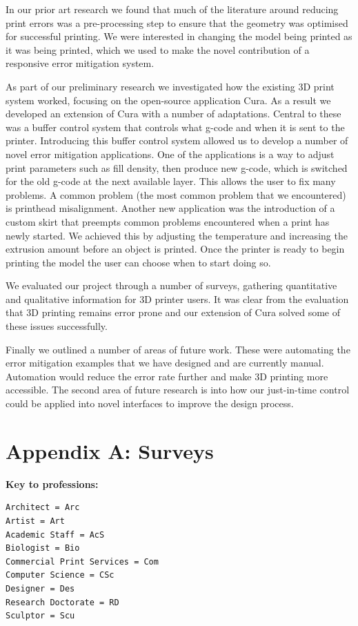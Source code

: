 \documentclass[11pt]{report} %
\begin{document}
In our prior art research we found that much of the literature around reducing print errors was a pre-processing step to ensure that the geometry was optimised for successful printing. We were interested in changing the model being printed as it was being printed, which we used to make the novel contribution of a responsive error mitigation system. 

As part of our preliminary research we investigated how the existing 3D print system worked, focusing on the open-source application Cura. As a result we developed an extension of Cura with a number of adaptations. Central to these was a buffer control system that controls what g-code and when it is sent to the printer. Introducing this buffer control system allowed us to develop a number of novel error mitigation applications. One of the applications is a way to adjust print parameters such as fill density, then produce new g-code, which is switched for the old g-code at the next available layer. This allows the user to fix many problems. A common problem (the most common problem that we encountered) is printhead misalignment. Another new application was the introduction of a custom skirt that preempts common problems encountered when a print has newly started. We achieved this by adjusting the temperature and increasing the extrusion amount before an object is printed. Once the printer is ready to begin printing the model the user can choose when to start doing so. 

We evaluated our project through a number of surveys, gathering quantitative and qualitative information for 3D printer users. It was clear from the evaluation that 3D printing remains error prone and our extension of Cura solved some of these issues successfully.  

Finally we outlined a number of areas of future work. These were automating the error mitigation examples that we have designed and are currently manual. Automation would reduce the error rate further and make 3D printing more accessible. The second area of future research is into how our just-in-time control could be applied into novel interfaces to improve the design process.




\chapter{Appendix A: Surveys}
\label{section:AppendixA}


\textbf{Key to professions:}
\begin{verbatim}
Architect = Arc
Artist = Art
Academic Staff = AcS
Biologist = Bio
Commercial Print Services = Com
Computer Science = CSc
Designer = Des
Research Doctorate = RD
Sculptor = Scu
\end{verbatim}
\end{document}
